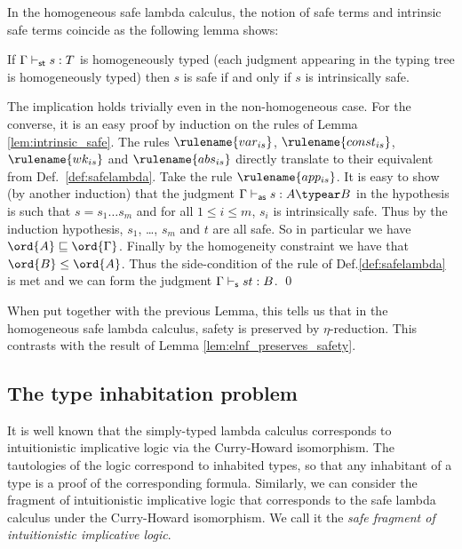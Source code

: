 In the homogeneous safe lambda calculus, the notion of safe terms and intrinsic safe terms coincide as the following lemma shows:
\begin{lemma}
If $\Gamma \vdash_{\sf st} s : T$ is homogeneously typed (\ie each judgment
appearing in the typing tree is homogeneously typed) then
$s$ is safe if and only if $s$ is intrinsically safe. 
\end{lemma}
\proof
The implication holds trivially even in the non-homogeneous case.
For the converse, it is an easy proof by induction on the rules of 
Lemma \ref{lem:intrinsic_safe}. The rules 
$\rulename{var_{is}}$, $\rulename{const_{is}}$, $\rulename{wk_{is}}$ and 
$\rulename{abs_{is}}$ directly translate to their equivalent from
Def.\ \ref{def:safelambda}.
Take the rule $\rulename{app_{is}}$. It is easy to show
(by another induction) that the judgment $\Gamma \asentail s : A \typear B$ in the hypothesis is such that $s = s_1 \ldots s_m$ and for all $1 \leq i\leq m$, $s_i$ is intrinsically safe. Thus by the induction hypothesis, $s_1$, \ldots, $s_m$ and $t$ are all safe. So in particular we have $\ord{A}\sqsubseteq\ord{\Gamma}$.
Finally by the homogeneity constraint we have that $\ord{B} \leq \ord{A}$.
Thus the side-condition of the rule  of
Def.\ref{def:safelambda} is met and we can form the judgment $\Gamma \vdash_{\sf s} s t : B$.
\qed


When put together with the previous Lemma, this tells us that in the homogeneous safe lambda calculus, safety is preserved by $\eta$-reduction.
This contrasts with the result of Lemma \ref{lem:elnf_preserves_safety}.


\subsection*{The type inhabitation problem}

It is well known that the simply-typed lambda calculus corresponds
to intuitionistic implicative logic via the Curry-Howard
isomorphism. The tautologies of the logic correspond to inhabited
types, so that any inhabitant of a type is a proof of the
corresponding formula. Similarly, we can consider the fragment of
intuitionistic implicative logic that corresponds to the safe lambda
calculus under the Curry-Howard isomorphism. We call it the
\emph{safe fragment of intuitionistic implicative logic}.

